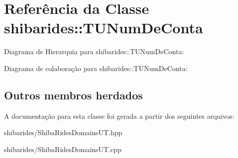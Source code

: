 \hypertarget{classshibarides_1_1TUNumDeConta}{}\section{Referência da Classe shibarides\+:\+:T\+U\+Num\+De\+Conta}
\label{classshibarides_1_1TUNumDeConta}


Diagrama de Hierarquia para shibarides\+:\+:T\+U\+Num\+De\+Conta\+:


Diagrama de colaboração para shibarides\+:\+:T\+U\+Num\+De\+Conta\+:
\subsection*{Outros membros herdados}


A documentação para esta classe foi gerada a partir dos seguintes arquivos\+:\begin{DoxyCompactItemize}
\item 
shibarides/Shiba\+Rides\+Domains\+U\+T.\+hpp\item 
shibarides/Shiba\+Rides\+Domains\+U\+T.\+cpp\end{DoxyCompactItemize}
